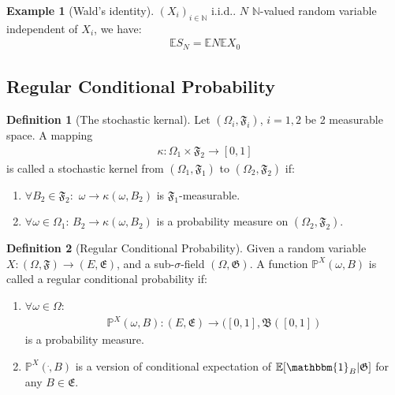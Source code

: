 \documentclass[a4paper,11pt]{book}
\theoremstyle{definition}
\newtheorem{definition}{Definition}[section]
\newtheorem*{example}{Example}
\theoremstyle{remark}
\begin{document}
\begin{example}[Wald's identity]
$(X_i)_{i \in \mathbb{N}}$ i.i.d.. $N$ $\mathbb{N}$-valued random variable independent of $X_i$, we have:
\begin{align*}
	\mathbb{E}S_N = \mathbb{E}N \mathbb{E}X_0
\end{align*}
\end{example}



\subsection{Regular Conditional Probability}
\begin{definition}[The stochastic kernal]
	Let $(\Omega_i, \mathfrak{F}_i)$, $i = 1, 2$ be 2 measurable space. A mapping
	\begin{align*}
		\kappa: \Omega_1 \times \mathfrak{F}_2 \rightarrow [0, 1] 
	\end{align*}
	is called a stochastic kernel from $(\Omega_1, \mathfrak{F}_1)$ to $(\Omega_2, \mathfrak{F}_2)$ if:
	\begin{enumerate}
		\item $\forall B_2 \in \mathfrak{F}_2: $ $\omega \rightarrow \kappa(\omega, B_2)$ is $\mathfrak{F}_1$-measurable.
		\item $\forall \omega \in \Omega_1$: $B_2 \rightarrow \kappa(\omega, B_2)$ is a probability measure on $(\Omega_2, \mathfrak{F}_2)$.
	\end{enumerate}
\end{definition}

\begin{definition}[Regular Conditional Probability]
Given a random variable $X: (\Omega, \mathfrak{F}) \rightarrow (E, \mathfrak{E})$, and a sub-$\sigma$-field $(\Omega, \mathfrak{G})$. A function $\mathbb{P}^X(\omega, B)$ is called a regular conditional probability if:
\begin{enumerate}
	\item $\forall \omega \in \Omega$: 
	\begin{align*}
		\mathbb{P}^X(\omega, B):  (E, \mathfrak{E}) \rightarrow ([0, 1], \mathfrak{B}([0, 1])
	\end{align*}  is a probability measure.
	\item $\mathbb{P}^X(\dot, B)$ is a version of conditional expectation of $\mathbb{E}[\mathbbm{1}_{B}|\mathfrak{G}]$ for any $B \in \mathfrak{E }$.
\end{enumerate}
\end{definition}
\end{document}
